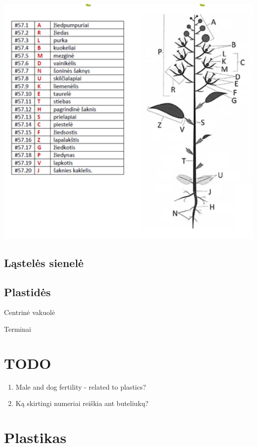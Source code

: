\documentclass[]{book}
\providecommand{\tightlist}{%
  \setlength{\itemsep}{0pt}\setlength{\parskip}{0pt}}
\begin{document}
\includegraphics[width=6in]{static/augalai/augalo_dalys}

\hypertarget{lasteles-sienele}{%
\section{Ląstelės sienelė}\label{lasteles-sienele}}

\hypertarget{plastides}{%
\section{Plastidės}\label{plastides}}

Centrinė vakuolė

Terminai

\hypertarget{todo-1}{%
\chapter{TODO}\label{todo-1}}

\begin{enumerate}
\def\labelenumi{\arabic{enumi}.}
\tightlist
\item
  Male and dog fertility - related to plastics?
\item
  Ką skirtingi numeriai reiškia ant buteliukų?
\end{enumerate}

\hypertarget{plastikas}{%
\chapter{Plastikas}\label{plastikas}}
\end{document}

